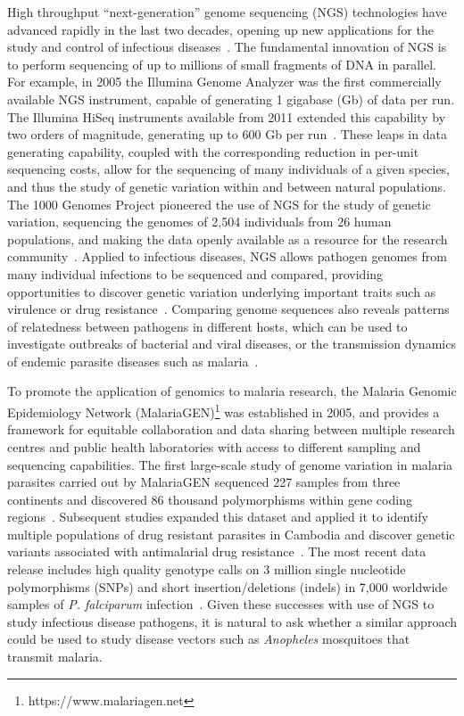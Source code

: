 \begin{refsection}
High throughput ``next-generation'' genome sequencing (NGS) technologies have advanced rapidly in the last two decades, opening up new applications for the study and control of infectious diseases~\parencite{Goodwin2016}.
%
The fundamental innovation of NGS is to perform sequencing of up to millions of small fragments of DNA in parallel.
%
For example, in 2005 the Illumina Genome Analyzer was the first commercially available NGS instrument, capable of generating 1 gigabase (Gb) of data per run.
%
The Illumina HiSeq instruments available from 2011 extended this capability by two orders of magnitude, generating up to 600 Gb per run~\parencite{Illumina2017}.
%
These leaps in data generating capability, coupled with the corresponding reduction in per-unit sequencing costs, allow for the sequencing of many individuals of a given species, and thus the study of genetic variation within and between natural populations.
%
The 1000 Genomes Project pioneered the use of NGS for the study of genetic variation, sequencing the genomes of 2,504 individuals from 26 human populations, and making the data openly available as a resource for the research community~\parencite{1000G2015}.
%
Applied to infectious diseases, NGS allows pathogen genomes from many individual infections to be sequenced and compared, providing opportunities to discover genetic variation underlying important traits such as virulence or drug resistance~\parencite{Armstrong2019}.
%
Comparing genome sequences also reveals patterns of relatedness between pathogens in different hosts, which can be used to investigate outbreaks of bacterial and viral diseases, or the transmission dynamics of endemic parasite diseases such as malaria~\parencite{Robinson2013,Daniels2015,Wohl2016,Neafsey2017,Wesolowski2018,Armstrong2019}.

To promote the application of genomics to malaria research, the Malaria Genomic Epidemiology Network (MalariaGEN)\footnote{https://www.malariagen.net} was established in 2005, and provides a framework for equitable collaboration and data sharing between multiple research centres and public health laboratories with access to different sampling and sequencing capabilities. 
%
The first large-scale study of genome variation in malaria parasites carried out by MalariaGEN sequenced 227 samples from three continents and discovered 86 thousand polymorphisms within gene coding regions~\parencite{Manske2012}.
%
Subsequent studies expanded this dataset and applied it to identify multiple populations of drug resistant parasites in Cambodia and discover genetic variants associated with antimalarial drug resistance~\parencite{Miotto2013,Miotto2015}.
%
The most recent data release includes high quality genotype calls on 3 million single nucleotide polymorphisms (SNPs) and short insertion/deletions (indels) in 7,000 worldwide samples of \textit{P. falciparum} infection~\parencite{MalariaGEN2019PF}.
%
Given these successes with use of NGS to study infectious disease pathogens, it is natural to ask whether a similar approach could be used to study disease vectors such as \textit{Anopheles} mosquitoes that transmit malaria.
%



\end{refsection}
